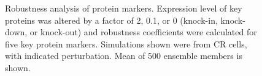 \documentclass[12pt]{article}
\begin{document}
\begin{figure}\centering
\caption{Robustness analysis of protein markers. Expression level of key proteins was altered by a factor of 2, 0.1, or 0 (knock-in, knock-down, or knock-out) and robustness coefficients were calculated for five key protein markers. Simulations shown were from CR cells, with indicated perturbation. Mean of 500 ensemble members is shown. }
\label{fg:Supp_Robustness}
\end{figure}

\end{document}
